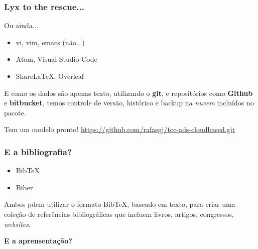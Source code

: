 \begin{frame}
    \frametitle{Lyx to the rescue...}
    Ou ainda...
    \begin{itemize}
        \item vi, vim, emacs (não...)
        \item Atom, Visual Studio Code
        \item ShareLaTeX, Overleaf
    \end{itemize}
\end{frame}

\begin{frame}
        \vspace{2cm}
        E como os dados são apenas texto, utilizando o \textbf{git}, e repositórios
        como \textbf{Github} e \textbf{bitbucket}, temos controle de versão, histórico
        e backup na \emph{nuvem} incluídos no pacote.
\end{frame}

\begin{frame}
    \begin{center}
    \vfill
    Tem um modelo pronto!
    \vfill
    \normalsize\url{https://github.com/rafasgj/tcc-ads-cloudbased.git}
    \vfill
    \end{center}
\end{frame}

\begin{frame}
    \frametitle{E a bibliografia?}
    \begin{itemize}
        \item{BibTeX}
        \item{Biber}
    \end{itemize}

    Ambos pdem utilizar o formato BibTeX, baseado em texto, para criar uma coleção
    de referências bibliográficas que incluem livros, artigos, congressos, \emph{websites}.
\end{frame}

{%
    \begin{frame}[t]
        \color{white} \huge \textbf{E a aprensentação?}
    \end{frame}
}

